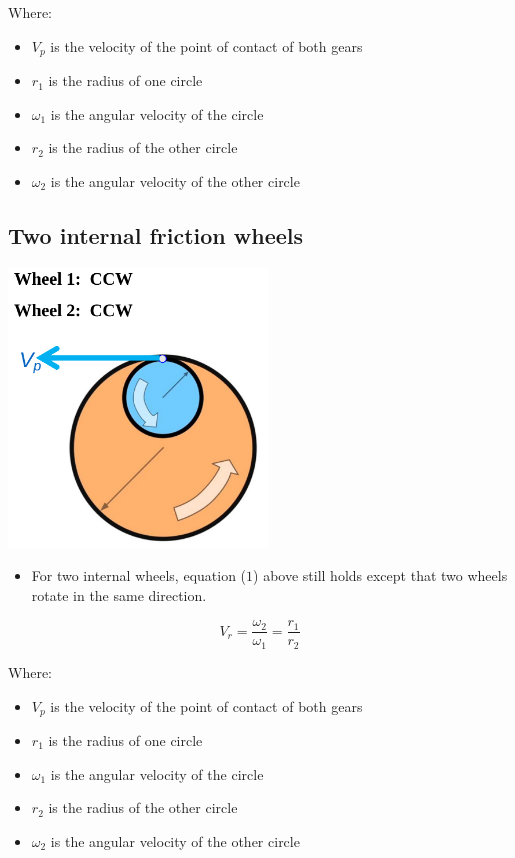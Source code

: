 \documentclass[11pt]{article}
\begin{document}
Where:
\begin{itemize}
\item \(V_p\) is the velocity of the point of contact of both gears
\item \(r_1\) is the radius of one circle
\item \(\omega_1\) is the angular velocity of the circle
\item \(r_2\) is the radius of the other circle
\item \(\omega_2\) is the angular velocity of the other circle
\end{itemize}
\subsection{Two internal friction wheels}
\label{sec:org6c72889}
\begin{center}
\includegraphics[height=20em]{./images/two-internal-friction-wheels.png}
\end{center}
\begin{itemize}
\item For two internal wheels, equation (\(1\)) above still holds except that two wheels rotate in the same direction.
\end{itemize}

\[V_r = \frac{\omega_2}{\omega_1} = \frac{r_1}{r_2} \tag{1}\]

Where:
\begin{itemize}
\item \(V_p\) is the velocity of the point of contact of both gears
\item \(r_1\) is the radius of one circle
\item \(\omega_1\) is the angular velocity of the circle
\item \(r_2\) is the radius of the other circle
\item \(\omega_2\) is the angular velocity of the other circle
\end{itemize}
\end{document}
